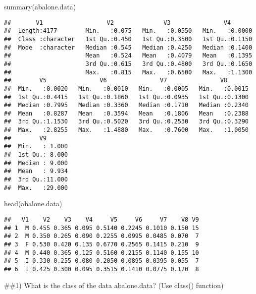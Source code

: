 \documentclass[
]{article}
\newenvironment{Shaded}{\begin{snugshade}}{\end{snugshade}}
\newcommand{\FunctionTok}[1]{\textcolor[rgb]{0.00,0.00,0.00}{#1}}
\newcommand{\NormalTok}[1]{#1}
\begin{document}
\begin{Shaded}
\begin{Highlighting}[]
\FunctionTok{summary}\NormalTok{(abalone.data)}
\end{Highlighting}
\end{Shaded}

\begin{verbatim}
##       V1                  V2              V3               V4        
##  Length:4177        Min.   :0.075   Min.   :0.0550   Min.   :0.0000  
##  Class :character   1st Qu.:0.450   1st Qu.:0.3500   1st Qu.:0.1150  
##  Mode  :character   Median :0.545   Median :0.4250   Median :0.1400  
##                     Mean   :0.524   Mean   :0.4079   Mean   :0.1395  
##                     3rd Qu.:0.615   3rd Qu.:0.4800   3rd Qu.:0.1650  
##                     Max.   :0.815   Max.   :0.6500   Max.   :1.1300  
##        V5               V6               V7               V8        
##  Min.   :0.0020   Min.   :0.0010   Min.   :0.0005   Min.   :0.0015  
##  1st Qu.:0.4415   1st Qu.:0.1860   1st Qu.:0.0935   1st Qu.:0.1300  
##  Median :0.7995   Median :0.3360   Median :0.1710   Median :0.2340  
##  Mean   :0.8287   Mean   :0.3594   Mean   :0.1806   Mean   :0.2388  
##  3rd Qu.:1.1530   3rd Qu.:0.5020   3rd Qu.:0.2530   3rd Qu.:0.3290  
##  Max.   :2.8255   Max.   :1.4880   Max.   :0.7600   Max.   :1.0050  
##        V9        
##  Min.   : 1.000  
##  1st Qu.: 8.000  
##  Median : 9.000  
##  Mean   : 9.934  
##  3rd Qu.:11.000  
##  Max.   :29.000
\end{verbatim}

\begin{Shaded}
\begin{Highlighting}[]
\FunctionTok{head}\NormalTok{(abalone.data)}
\end{Highlighting}
\end{Shaded}

\begin{verbatim}
##   V1    V2    V3    V4     V5     V6     V7    V8 V9
## 1  M 0.455 0.365 0.095 0.5140 0.2245 0.1010 0.150 15
## 2  M 0.350 0.265 0.090 0.2255 0.0995 0.0485 0.070  7
## 3  F 0.530 0.420 0.135 0.6770 0.2565 0.1415 0.210  9
## 4  M 0.440 0.365 0.125 0.5160 0.2155 0.1140 0.155 10
## 5  I 0.330 0.255 0.080 0.2050 0.0895 0.0395 0.055  7
## 6  I 0.425 0.300 0.095 0.3515 0.1410 0.0775 0.120  8
\end{verbatim}

\#\#1) What is the class of the data abalone.data? (Use class()
function)
\end{document}

